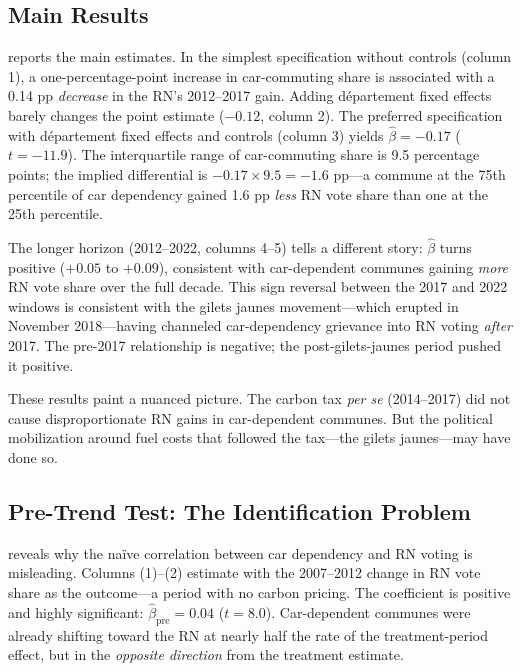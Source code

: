 \documentclass[12pt]{article}
\begin{document}
\subsection{Main Results}

 reports the main estimates. In the simplest specification without controls (column 1), a one-percentage-point increase in car-commuting share is associated with a 0.14 pp \textit{decrease} in the RN's 2012--2017 gain. Adding d\'{e}partement fixed effects barely changes the point estimate ($-0.12$, column 2). The preferred specification with d\'{e}partement fixed effects and controls (column 3) yields $\hat{\beta} = -0.17$ ($t = -11.9$). The interquartile range of car-commuting share is 9.5 percentage points; the implied differential is $-0.17 \times 9.5 = -1.6$ pp---a commune at the 75th percentile of car dependency gained 1.6 pp \textit{less} RN vote share than one at the 25th percentile.

The longer horizon (2012--2022, columns 4--5) tells a different story: $\hat{\beta}$ turns positive ($+0.05$ to $+0.09$), consistent with car-dependent communes gaining \textit{more} RN vote share over the full decade. This sign reversal between the 2017 and 2022 windows is consistent with the gilets jaunes movement---which erupted in November 2018---having channeled car-dependency grievance into RN voting \textit{after} 2017. The pre-2017 relationship is negative; the post-gilets-jaunes period pushed it positive.

These results paint a nuanced picture. The carbon tax \textit{per se} (2014--2017) did not cause disproportionate RN gains in car-dependent communes. But the political mobilization around fuel costs that followed the tax---the gilets jaunes---may have done so.



\subsection{Pre-Trend Test: The Identification Problem}

 reveals why the na\"{i}ve correlation between car dependency and RN voting is misleading. Columns (1)--(2) estimate  with the 2007--2012 change in RN vote share as the outcome---a period with no carbon pricing. The coefficient is positive and highly significant: $\hat{\beta}_{\text{pre}} = 0.04$ ($t = 8.0$). Car-dependent communes were already shifting toward the RN at nearly half the rate of the treatment-period effect, but in the \textit{opposite direction} from the treatment estimate.
\end{document}

